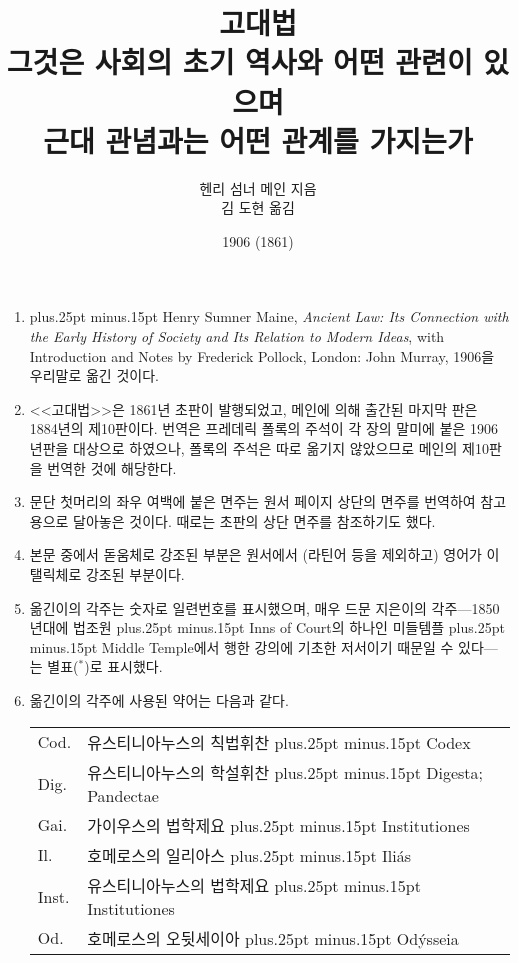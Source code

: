 \documentclass[b5paper]{book}
\def\latinmarks{\hangulpunctuations=0
    \aftergroup\hangulpunctuations\aftergroup1\aftergroup\relax }
\def\latin#1{\ifnum\lastskip=0 \penalty50 \hskip0pt plus.25pt minus.15pt\fi
  \begingroup\latinmarks\footnotesize #1\endgroup}
\def\paren#1{\begingroup\small(#1)\endgroup}
\begin{document}
\title{고대법\\
\large 그것은 사회의 초기 역사와 어떤 관련이 있으며\\
근대 관념과는 어떤 관계를 가지는가}
\author{헨리 섬너 메인 지음\\
김 도현 옮김}
\date{1906 (1861)}

\frontmatter

\maketitle

\null\vfill
\thispagestyle{empty}
\begin{enumerate}
    \small
  \item \latin{\small
    Henry Sumner Maine, \textit{Ancient Law: Its Connection with
    the Early History of Society and Its Relation to Modern Ideas}, with
    Introduction and Notes by Frederick Pollock, London: John Murray,
    1906}을 우리말로 옮긴 것이다.
  \item <<고대법>>은 1861년 초판이 발행되었고,
    메인에 의해 출간된 마지막 판은 1884년의 제10판이다.
    번역은 프레데릭 폴록의 주석이
    각 장의 말미에 붙은 1906년판을 대상으로 하였으나,
    폴록의 주석은 따로 옮기지 않았으므로
    메인의 제10판을 번역한 것에 해당한다.
  \item 문단 첫머리의 좌우 여백에 붙은 면주는 원서 페이지 상단의 면주를
    번역하여
    참고용으로
    달아놓은 것이다.
    때로는 초판의 상단 면주를 참조하기도 했다.
  \item 본문 중에서 돋움체로 강조된 부분은
    원서에서 \paren{라틴어 등을 제외하고} 영어가
    이탤릭체로 강조된 부분이다.
  \item 옮긴이의 각주는 숫자로 일련번호를 표시했으며,
    매우 드문 지은이의 각주---1850년대에 법조원\latin{Inns of Court}의
    하나인 미들템플\latin{Middle Temple}에서
    행한 강의에 기초한 저서이기 때문일 수 있다---는
    별표($^*$)로 표시했다.
  \item 옮긴이의 각주에 사용된 약어는 다음과 같다.

    \begin{tabular}{l@{ $=$ }l}
      Cod.  & 유스티니아누스의 칙법휘찬\latin{Codex} \\
      Dig.  & 유스티니아누스의 학설휘찬\latin{Digesta; Pandectae} \\
      Gai.  & 가이우스의 법학제요\latin{Institutiones} \\
      Il.   & 호메로스의 일리아스\latin{Iliás} \\
      Inst. & 유스티니아누스의 법학제요\latin{Institutiones} \\
      Od.   & 호메로스의 오뒷세이아\latin{Odýsseia} \\
    \end{tabular}
\end{enumerate}
\end{document}
